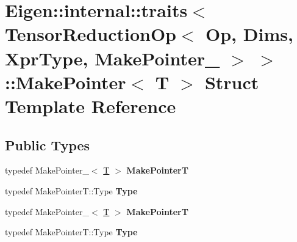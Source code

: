 \hypertarget{struct_eigen_1_1internal_1_1traits_3_01_tensor_reduction_op_3_01_op_00_01_dims_00_01_xpr_type_00c39382462f4a2e2ae6af6fe0f8aab669}{}\section{Eigen\+:\+:internal\+:\+:traits$<$ Tensor\+Reduction\+Op$<$ Op, Dims, Xpr\+Type, Make\+Pointer\+\_\+ $>$ $>$\+:\+:Make\+Pointer$<$ T $>$ Struct Template Reference}
\label{struct_eigen_1_1internal_1_1traits_3_01_tensor_reduction_op_3_01_op_00_01_dims_00_01_xpr_type_00c39382462f4a2e2ae6af6fe0f8aab669}
\subsection*{Public Types}
\begin{DoxyCompactItemize}
\item 
\mbox{\label{struct_eigen_1_1internal_1_1traits_3_01_tensor_reduction_op_3_01_op_00_01_dims_00_01_xpr_type_00c39382462f4a2e2ae6af6fe0f8aab669_ac76d9908bb2bf70cd409d93aaa2f23ed}} 
typedef Make\+Pointer\+\_\+$<$ \hyperlink{group___sparse_core___module}{T} $>$ {\bfseries Make\+PointerT}
\item 
\mbox{\label{struct_eigen_1_1internal_1_1traits_3_01_tensor_reduction_op_3_01_op_00_01_dims_00_01_xpr_type_00c39382462f4a2e2ae6af6fe0f8aab669_af5c5a370bc10cc801691de11562f8be3}} 
typedef Make\+Pointer\+T\+::\+Type {\bfseries Type}
\item 
\mbox{\label{struct_eigen_1_1internal_1_1traits_3_01_tensor_reduction_op_3_01_op_00_01_dims_00_01_xpr_type_00c39382462f4a2e2ae6af6fe0f8aab669_ac76d9908bb2bf70cd409d93aaa2f23ed}} 
typedef Make\+Pointer\+\_\+$<$ \hyperlink{group___sparse_core___module}{T} $>$ {\bfseries Make\+PointerT}
\item 
\mbox{\label{struct_eigen_1_1internal_1_1traits_3_01_tensor_reduction_op_3_01_op_00_01_dims_00_01_xpr_type_00c39382462f4a2e2ae6af6fe0f8aab669_af5c5a370bc10cc801691de11562f8be3}} 
typedef Make\+Pointer\+T\+::\+Type {\bfseries Type}
\end{DoxyCompactItemize}


